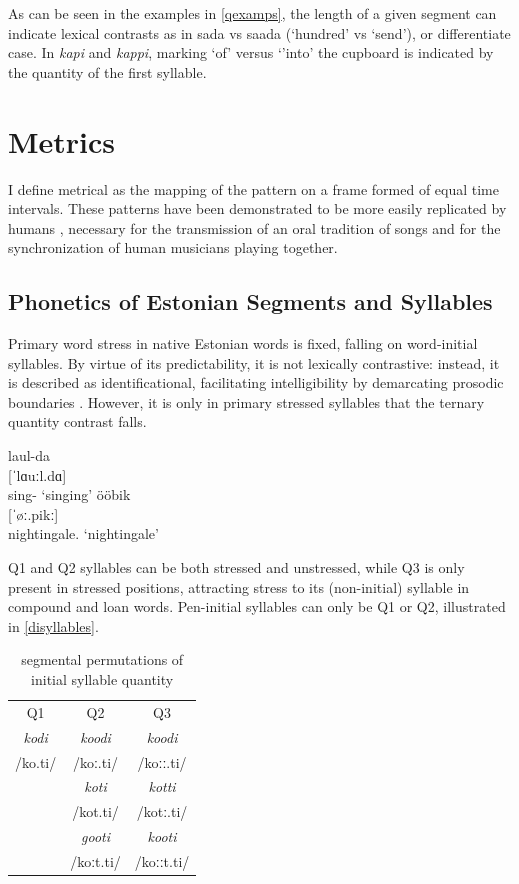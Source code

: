 As can be seen in the examples in \ref{qexamps}, the length of a given segment can indicate lexical contrasts as in sada vs saada (`hundred' vs `send'), or differentiate case. In {\it kapi} and {\it kappi}, marking `of' versus `'into' the cupboard is indicated by the quantity of the first syllable. 
\section{Metrics}

 I define metrical as the mapping of the pattern on a frame formed of equal time intervals. These patterns have been demonstrated to be more easily replicated by humans \citep{essensPovel1985}, necessary for the transmission of an oral tradition of songs and for the synchronization of human musicians playing together. 

\subsection{Phonetics of Estonian Segments and Syllables}


Primary word stress in native Estonian words is fixed, falling on word-initial syllables. By virtue of its predictability, it is not lexically contrastive: instead, it is described as identificational, facilitating intelligibility by demarcating prosodic boundaries \citep{lehiste1965, lehiste1978,lehiste1992, eekMeister1998, lippusAsuMari2014}. However, it is only in primary stressed syllables that the ternary quantity contrast falls. \begin{center}
\begin{exe}
\ex \gll laul-da \\
	{[ˈlɑuːl.dɑ]} \\
	sing-\Tr{} 
	\glt	`singing'
\ex 	\gll ööbik \\
	{[ˈøː.pikː]} \\
	nightingale.\Nom{} 
	\glt`nightingale'
\label{disyllables}
\end{exe}
\end{center}
Q1 and Q2 syllables can be both stressed and unstressed, while Q3 is only present in stressed positions, attracting stress to its (non-initial) syllable in compound and loan words. Pen-initial syllables can only be Q1 or Q2, illustrated in \ref{disyllables}. 

 \begin{table}[htb]
\centering
\begin{tabular}{ccc}
\hline
Q1 & Q2 & Q3 \\
{\it kodi	} 	& {\it koodi }	& {\it koodi }	\\  
/ko.ti/		& /koː.ti/	& /koːː.ti/	\\
\hline
		& {\it koti }	& {\it kotti}	 \\
		& /kot.ti/	& /kotː.ti/	\\
\hline
		& {\it gooti}	& {\it kooti} 	\\
		& /koːt.ti/	& /koːːt.ti/	\\
\hline
\end{tabular}

\caption{segmental permutations of initial syllable quantity}
\label{qperm}
\end{table}

